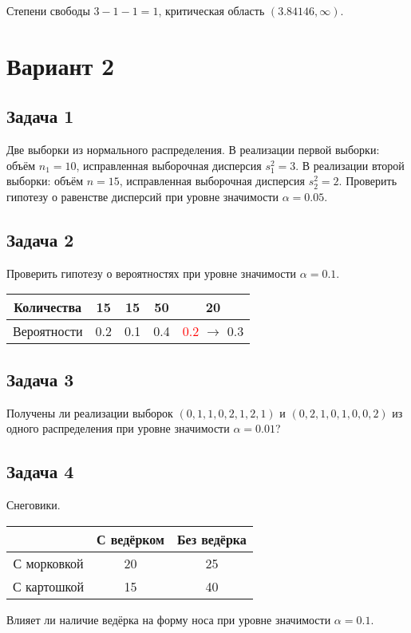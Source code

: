 \documentclass[a4paper,12pt]{article}
\begin{document}
Степени свободы $3-1-1=1$, критическая область $(3.84146, \infty)$.


\section*{Вариант 2}

\subsection*{Задача 1}

Две выборки из нормального распределения. В реализации первой выборки: объём $n_1 = 10$, исправленная выборочная дисперсия $s_1^2 = 3$.
В реализации второй выборки: объём $n=15$, исправленная выборочная дисперсия $s_2^2 = 2$. Проверить гипотезу о равенстве дисперсий
при уровне значимости $\alpha = 0.05$.

\subsection*{Задача 2}

Проверить гипотезу о вероятностях при уровне значимости $\alpha = 0.1$.

\begin{tabular}{|c|c|c|c|c|}
    \hline
    Количества  & 15  & 15  & 50  & 20                                     \\
    \hline
    Вероятности & 0.2 & 0.1 & 0.4 & \textcolor{red}{0.2} $\rightarrow$ 0.3 \\
    \hline
\end{tabular}

\subsection*{Задача 3}

Получены ли реализации выборок $(0, 1, 1, 0, 2, 1, 2, 1)$ и $(0, 2, 1, 0, 1, 0, 0, 2)$ из одного распределения при уровне значимости $\alpha = 0.01$?

\subsection*{Задача 4}

Снеговики.

\begin{tabular}{|c|c|c|}
    \hline
                & С ведёрком & Без ведёрка \\
    \hline
    С морковкой & 20         & 25          \\
    \hline
    С картошкой & 15         & 40          \\
    \hline
\end{tabular}

Влияет ли наличие ведёрка на форму носа при уровне значимости $\alpha=0.1$.
\end{document}
